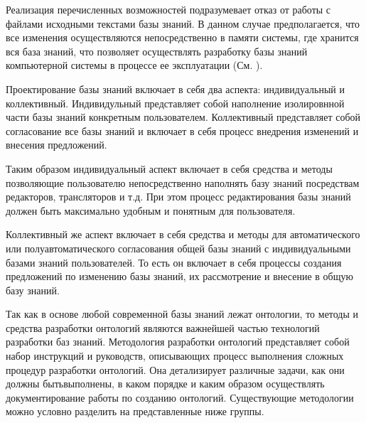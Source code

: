 Реализация перечисленных возможностей подразумевает отказ от работы с файлами исходными текстами базы знаний. В данном случае предполагается, что все изменения осуществляются непосредственно в памяти системы, где хранится вся база знаний, что позволяет осуществлять разработку базы знаний компьютерной системы в процессе ее эксплуатации (См. ).


Проектирование базы знаний включает в себя два аспекта: индивидуальный и коллективный.
Индивидульный представляет собой наполнение изолировнной части базы знаний конкретным пользователем.
Коллективный представляет собой согласование все базы знаний и включает в себя процесс внедрения изменений и внесения предложений.

Таким образом индивидуальный аспект включает в себя средства и методы позволяющие пользователю непосредственно наполнять базу знаний посредствам редакторов, трансляторов и т.д. При этом процесс редактирования базы знаний должен быть максимально удобным и понятным для пользователя.

Коллективный же аспект включает в себя средства и методы для автоматического или полуавтоматического согласования общей базы знаний с индивидуальными базами знаний пользователей. То есть он включает в себя процессы создания предложений по изменению базы знаний, их рассмотрение и внесение в общую базу знаний.

Так как в основе любой современной базы знаний лежат онтологии, то методы и средства разработки онтологий являются важнейшей частью технологий разработки баз знаний.
Методология разработки онтологий представляет собой набор инструкций и руководств, описывающих процесс выполнения сложных процедур разработки онтологий.
Она детализирует различные задачи, как они должны бытьвыполнены, в каком порядке и каким образом осуществлять документирование работы по созданию онтологий.
Существующие методологии можно условно разделить на представленные ниже группы.


